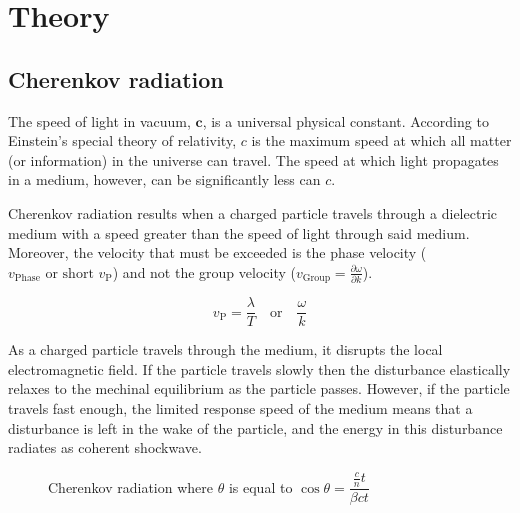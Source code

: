 \documentclass[11pt,twoside]{scrreprt}
\begin{document}

\chapter{Theory}

\section{Cherenkov radiation} %
\label{sec:cherenkov_radiation}

The speed of light in vacuum, \( \mathbf{c} \), is a universal physical constant. According to Einstein's special theory of relativity, \( c \) is the maximum speed at which all matter (or information) in the universe can travel. The speed at which light propagates in a medium, however, can be significantly less can \( c \).

Cherenkov radiation results when a charged particle travels through a dielectric medium with a speed greater than the speed of light through said medium. Moreover, the velocity that must be exceeded is the phase velocity (\( v_{\text{Phase}} \text{ or short } v_{\text{P}} \)) and not the group velocity (\( v_{\text{Group}} = \frac{\partial \omega}{\partial k} \)).

\[ v_{\text{P}} = \frac{\lambda}{T} \quad \text{or} \quad \frac{\omega}{k}\]

As a charged particle travels through the medium, it disrupts the local electromagnetic field. If the particle travels slowly then the disturbance elastically relaxes to the mechinal equilibrium as the particle passes. However, if the particle travels fast enough, the limited response speed of the medium means that a disturbance is left in the wake of the particle, and the energy in this disturbance radiates as coherent shockwave.

\begin{figure}[htbp]
  \centering
  \caption{Cherenkov radiation where $\theta$ is equal to $\cos\theta = \dfrac{\frac{c}{n}t}{\beta ct}$}
  \label{fig:label}
\end{figure}
\end{document}
